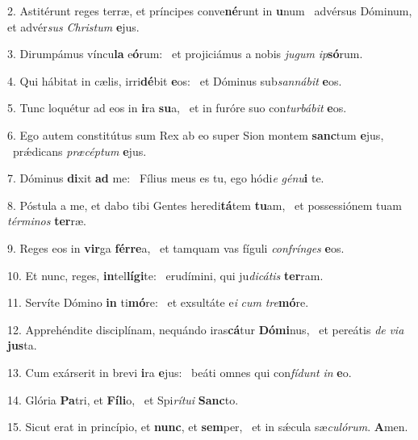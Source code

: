 2. Astitérunt reges terræ, et príncipes conve\textbf{né}runt in \textbf{u}num \ast\  advérsus Dóminum, et advér\textit{sus} \textit{Chris}\textit{tum} \textbf{e}jus.\

3. Dirumpámus víncu\textbf{la} e\textbf{ó}rum: \ast\  et projiciámus a nobis \textit{ju}\textit{gum} \textit{ip}\textbf{só}rum.\

4. Qui hábitat in cælis, irri\textbf{dé}bit \textbf{e}os: \ast\  et Dóminus sub\textit{san}\textit{ná}\textit{bit} \textbf{e}os.\

5. Tunc loquétur ad eos in \textbf{i}ra \textbf{su}a, \ast\  et in furóre suo con\textit{tur}\textit{bá}\textit{bit} \textbf{e}os.\

6. Ego autem constitútus sum Rex ab eo super Sion montem \textbf{sanc}tum \textbf{e}jus, \ast\  prǽdicans \textit{præ}\textit{cép}\textit{tum} \textbf{e}jus.\

7. Dóminus \textbf{di}xit \textbf{ad} me: \ast\  Fílius meus es tu, ego hódi\textit{e} \textit{gé}\textit{nu}\textbf{i} te.\

8. Póstula a me, et dabo tibi Gentes heredi\textbf{tá}tem \textbf{tu}am, \ast\  et possessiónem tuam \textit{tér}\textit{mi}\textit{nos} \textbf{ter}ræ.\

9. Reges eos in \textbf{vir}ga \textbf{fér}\textbf{re}a, \ast\  et tamquam vas fíguli \textit{con}\textit{frín}\textit{ges} \textbf{e}os.\

10. Et nunc, reges, \textbf{in}tel\textbf{lí}\textbf{gi}te: \ast\  erudímini, qui ju\textit{di}\textit{cá}\textit{tis} \textbf{ter}ram.\

11. Servíte Dómino \textbf{in} ti\textbf{mó}re: \ast\  et exsultáte e\textit{i} \textit{cum} \textit{tre}\textbf{mó}re.\

12. Apprehéndite disciplínam, nequándo iras\textbf{cá}tur \textbf{Dó}\textbf{mi}nus, \ast\  et pereátis \textit{de} \textit{vi}\textit{a} \textbf{jus}ta.\

13. Cum exárserit in brevi \textbf{i}ra \textbf{e}jus: \ast\  beáti omnes qui con\textit{fí}\textit{dunt} \textit{in} \textbf{e}o.\

14. Glória \textbf{Pa}tri, et \textbf{Fí}\textbf{li}o, \ast\  et Spi\textit{rí}\textit{tu}\textit{i} \textbf{Sanc}to.\

15. Sicut erat in princípio, et \textbf{nunc}, et \textbf{sem}per, \ast\  et in sǽcula sæ\textit{cu}\textit{ló}\textit{rum}. \textbf{A}men.\

